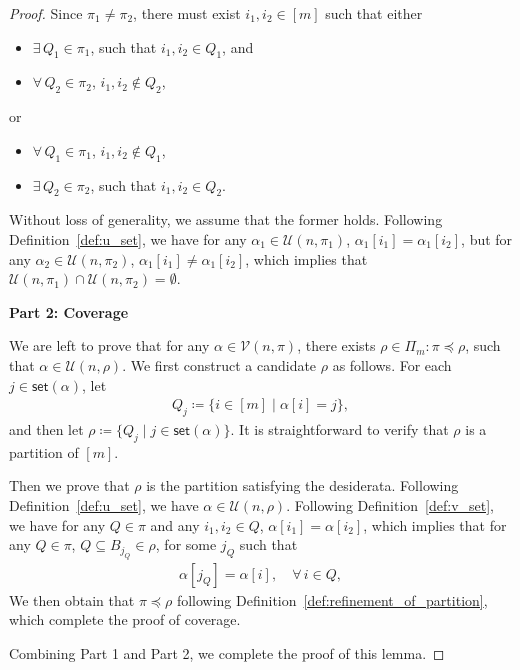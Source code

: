 \documentclass[12pt]{article}
\theoremstyle{plain}
\theoremstyle{definition}
\newcommand{\sPi}{\pi}
\newcommand{\uset}{\calU}
\newcommand{\usetnm}[2]{\uset\left(#1,#2\right)}
\newcommand{\vset}{\calV}
\newcommand{\vsetp}[2]{\vset(#1,#2)}
\newcommand{\takesetp}[1]{\mathsf{set}(#1)}
\newcommand{\partition}{\Pi}
\newcommand{\partitionp}[1]{\partition_{#1}}
\newcommand{\pleq}{\preceq}
\def\calV{\mathcal{V}}
\def\calU{\mathcal{U}}
\begin{document}
\begin{bibunit}[agsm]
\begin{proof}
    Since $\pi_1 \neq \pi_2$, there must exist $i_1, i_2 \in [m]$ such that either
    \begin{itemize}
        \item $\exists \, Q_1 \in \pi_1$, such that $i_1, i_2 \in Q_1$, and
        \item $\forall \, Q_2 \in \pi_2$, $i_1, i_2 \notin Q_2$, 
    \end{itemize}
    or 
    \begin{itemize}
        \item $\forall \, Q_1 \in \pi_1$, $i_1, i_2 \notin Q_1$, 
        \item $\exists \, Q_2 \in \pi_2$, such that $i_1, i_2 \in Q_2$.  
    \end{itemize}
    Without loss of generality, we assume that the former holds. Following Definition~\ref{def:u_set}, we have for any $\alpha_1 \in \usetnm{n}{\pi_1}$, $\alpha_1[i_1] = \alpha_1[i_2]$, but for any $\alpha_2 \in \usetnm{n}{\pi_2}$, $\alpha_1[i_1] \neq \alpha_1[i_2]$, which implies that $\usetnm{n}{\pi_1} \cap \usetnm{n}{\pi_2} = \emptyset$. 

    {\bf Part 2: Coverage}

    We are left to prove that for any $\alpha \in \vsetp{n}{\sPi}$, there exists $\rho \in \partitionp{m}: \sPi \pleq \rho$, such that $\alpha \in \usetnm{n}{\rho}$. We first construct a candidate $\rho$ as follows. For each $j \in \takesetp{\alpha}$, let
    \begin{align*}
    Q_j \coloneqq \{i \in [m] \mid \alpha[i] = j\},
    \end{align*}
    and then let $\rho \coloneqq \{Q_j \mid j \in \takesetp{\alpha}\}$. It is straightforward to verify that $\rho$ is a partition of $[m]$. 
    
    Then we prove that $\rho$ is the partition satisfying the desiderata. Following Definition~\ref{def:u_set}, we have $\alpha \in \usetnm{n}{\rho}$. Following Definition~\ref{def:v_set}, we have for any $Q \in \sPi$ and any $i_1, i_2 \in Q$, $\alpha[i_1] = \alpha[i_2]$, which implies that for any $Q \in \pi$, $Q \subseteq B_{j_Q} \in \rho$, for some $j_Q$ such that
    \begin{align*}
        \alpha[j_Q] = \alpha[i], \quad \forall \, i \in Q, 
    \end{align*}
    We then obtain that $\sPi \pleq \rho$ following Definition~\ref{def:refinement_of_partition}, which complete the proof of coverage. 

    Combining Part 1 and Part 2, we complete the proof of this lemma. 
\end{proof}


\end{bibunit}
\end{document}
